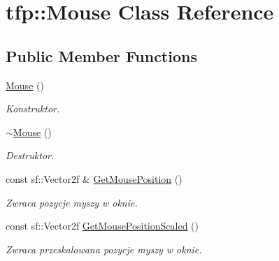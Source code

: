 \hypertarget{classtfp_1_1_mouse}{}\section{tfp\+:\+:Mouse Class Reference}
\label{classtfp_1_1_mouse}
\subsection*{Public Member Functions}
\begin{DoxyCompactItemize}
\item 
\mbox{\label{classtfp_1_1_mouse_a0544d0e8c26cdd2f4d7ce7a73ae10529}} 
\mbox{\hyperlink{classtfp_1_1_mouse_a0544d0e8c26cdd2f4d7ce7a73ae10529}{Mouse}} ()
\begin{DoxyCompactList}\small\item\em Konstruktor. \end{DoxyCompactList}\item 
\mbox{\label{classtfp_1_1_mouse_afb2244bb9f0e2ebfc55a13b30c498c60}} 
\mbox{\hyperlink{classtfp_1_1_mouse_afb2244bb9f0e2ebfc55a13b30c498c60}{$\sim$\+Mouse}} ()
\begin{DoxyCompactList}\small\item\em Destruktor. \end{DoxyCompactList}\item 
\mbox{\label{classtfp_1_1_mouse_a026645fcd024169978c3e3567a681dfa}} 
const sf\+::\+Vector2f \& \mbox{\hyperlink{classtfp_1_1_mouse_a026645fcd024169978c3e3567a681dfa}{Get\+Mouse\+Position}} ()
\begin{DoxyCompactList}\small\item\em Zwraca pozycje myszy w oknie. \end{DoxyCompactList}\item 
\mbox{\label{classtfp_1_1_mouse_ac76c2bb7580ac4c678640d3a0e27a17a}} 
const sf\+::\+Vector2f \mbox{\hyperlink{classtfp_1_1_mouse_ac76c2bb7580ac4c678640d3a0e27a17a}{Get\+Mouse\+Position\+Scaled}} ()
\begin{DoxyCompactList}\small\item\em Zwraca przeskalowana pozycje myszy w oknie. \end{DoxyCompactList}\item 
\mbox{\label{classtfp_1_1_mouse_a1f055556ba7923eae41e8bb0c309ebc5}} 

\end{DoxyCompactItemize}
